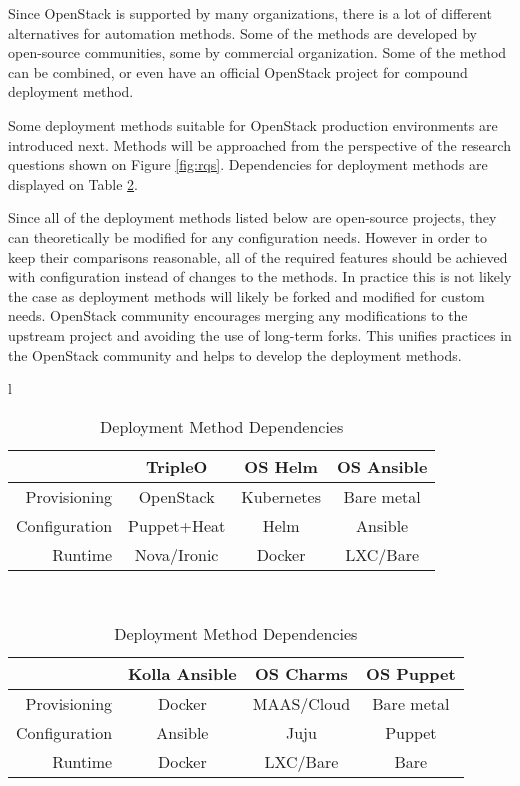 \documentclass[officiallayout]{tktla}
\begin{document}
Since OpenStack is supported by many organizations, there is a lot of different
alternatives for automation methods. Some of the methods are developed by
open-source communities, some by commercial organization. Some of the method
can be combined, or even have an official OpenStack project for compound
deployment method.

Some deployment methods suitable for OpenStack production environments are
introduced next. Methods will be approached from the perspective of the
research questions shown on Figure \ref{fig:rqs}. Dependencies for deployment
methods are displayed on Table \ref{tab:dependencies}.

Since all of the deployment methods listed below are open-source projects, they
can theoretically be modified for any configuration needs. However in order to
keep their comparisons reasonable, all of the required features should be
achieved with configuration instead of changes to the methods. In practice this
is not likely the case as deployment methods will likely be forked and modified
for custom needs. OpenStack community encourages merging any modifications to
the upstream project and avoiding the use of long-term forks. This unifies
practices in the OpenStack community and helps to develop the deployment
methods.

\begin{table}[t]
\centering
\begin{tabular}{ l }
\begin{tabular} {r | c c c } \\
              & TripleO     & OS Helm     & OS Ansible  \\
\hline
Provisioning  & OpenStack   & Kubernetes  & Bare metal  \\
Configuration & Puppet+Heat & Helm        & Ansible     \\
Runtime       & Nova/Ironic & Docker      & LXC/Bare    \\
\end{tabular} \\
\begin{tabular} {r | c c c } \\
              & Kolla Ansible & OS Charms   & OS Puppet \\
\hline
Provisioning  & Docker        & MAAS/Cloud  & Bare metal\\
Configuration & Ansible       & Juju        & Puppet    \\
Runtime       & Docker        & LXC/Bare    & Bare      \\
\end{tabular}
\end{tabular}
\caption{Deployment Method Dependencies}
\label{tab:dependencies}
\end{table}
\end{document}
